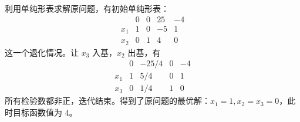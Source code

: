 利用单纯形表求解原问题，有初始单纯形表：
$$
\begin{array}{c|ccc|c} & 0 & 0 & 25 & -4 \\ \hline x_1 & 1 & 0 & -5 & 1 \\ x_2 & 0 & 1 & 4 & 0 \end{array}
$$
这一个退化情况。让 $x_3$ 入基，$x_2$ 出基，有
$$
\begin{array}{c|ccc|c} & 0 & -25/4 & 0 & -4 \\ \hline x_1 & 1 & 5/4 & 0 & 1 \\ x_3 & 0 & 1/4 & 1 & 0 \end{array}
$$
所有检验数都非正，迭代结束。得到了原问题的最优解：$x_1 = 1, x_2 = x_3 = 0$，此时目标函数值为 $4$。
\pagebreak
